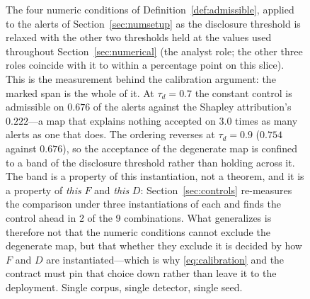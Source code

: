 \begin{figure}[t]
\centering
{}
\caption{The four numeric conditions of Definition~\ref{def:admissible}, applied
to the alerts of Section~\ref{sec:numsetup} as the disclosure threshold is
relaxed with the other two thresholds held at the values used throughout
Section~\ref{sec:numerical} (the analyst role; the other three roles coincide
with it to within a percentage point on this slice). This is the measurement
behind the calibration argument: the marked span is the whole of it. At $\tau_d=0.7$ the constant control is admissible on $0.676$ of the alerts against the Shapley attribution's $0.222$---a map that explains nothing accepted on $3.0$ times as many alerts as one that does. The ordering reverses at $\tau_d=0.9$ ($0.754$ against $0.676$), so the acceptance of the degenerate map is confined to a band of the disclosure threshold rather than holding across it. The band is a property of this
instantiation, not a theorem, and it is a property of \emph{this} $F$ and \emph{this} $D$: Section~\ref{sec:controls} re-measures the comparison under three instantiations of each and finds the control ahead in 2 of the 9 combinations. What generalizes is therefore not
that the numeric conditions cannot exclude the degenerate map, but that whether
they exclude it is decided by how $F$ and $D$ are instantiated---which is why
\eqref{eq:calibration} and the contract must pin that choice down rather than
leave it to the deployment. Single corpus, single detector, single seed.}
\label{fig:admissible}
\end{figure}

